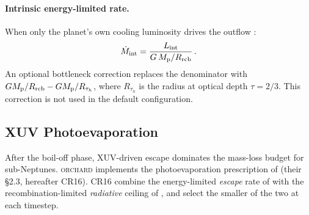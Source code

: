 \documentclass{aastex701}
\newcommand{\Mdot}{\dot{M}}
\newcommand{\Mp}{M_{\rm p}}
\newcommand{\Rrcb}{R_{\rm rcb}}
\newcommand{\Lint}{L_{\rm int}}
\newcommand{\orchard}{\textsc{orchard}}
\begin{document}
\paragraph{Intrinsic energy-limited rate.}
When only the planet's own cooling luminosity drives the outflow
\citep[Equation~27 of][]{Tang2024}:
\begin{equation}\label{eq:mdot_int}
  \Mdot_{\rm int} = \frac{\Lint}{G\,\Mp / \Rrcb}\,.
\end{equation}
An optional bottleneck correction replaces the denominator with
$G\Mp/\Rrcb - G\Mp/R_{\tau_h}$, where $R_{\tau_h}$ is the radius at
optical depth $\tau = 2/3$.  This correction is not used in the default
configuration.

\subsection{XUV Photoevaporation}\label{subsec:xuv}

After the boil-off phase, XUV-driven escape dominates the mass-loss
budget for sub-Neptunes.  \orchard{} implements the photoevaporation
prescription of \citet{ChenRogers2016} (their \S2.3, hereafter CR16).
CR16 combine the energy-limited \emph{escape} rate of
\citet{Erkaev2007} with the recombination-limited \emph{radiative}
ceiling of \citet{MurrayClay2009}, and select the smaller of the two
at each timestep.
\end{document}
